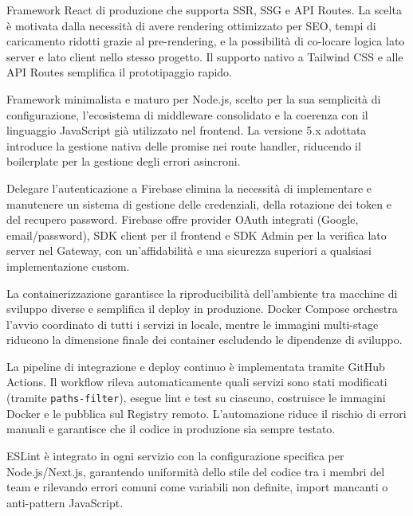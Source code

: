 \documentclass[12pt,a4paper,twoside]{report}
\newenvironment{toollist}{%
  \begin{description}[
    style=nextline,
    leftmargin=0pt,
    labelindent=0pt,
    font=\normalfont\bfseries,
    itemsep=6pt
  ]
}{%
  \end{description}
}
\begin{document}
\begin{toollist}
  \item[Next.js (Frontend)]
    Framework React di produzione che supporta SSR, SSG e API Routes. La scelta è motivata dalla necessità di avere rendering ottimizzato per SEO, tempi di caricamento ridotti grazie al pre-rendering, e la possibilità di co-locare logica lato server e lato client nello stesso progetto. Il supporto nativo a Tailwind CSS e alle API Routes semplifica il prototipaggio rapido.

  \item[Express.js (Backend)]
    Framework minimalista e maturo per Node.js, scelto per la sua semplicità di configurazione, l'ecosistema di middleware consolidato e la coerenza con il linguaggio JavaScript già utilizzato nel frontend. La versione 5.x adottata introduce la gestione nativa delle promise nei route handler, riducendo il boilerplate per la gestione degli errori asincroni.

  \item[Firebase Authentication]
    Delegare l'autenticazione a Firebase elimina la necessità di implementare e manutenere un sistema di gestione delle credenziali, della rotazione dei token e del recupero password. Firebase offre provider OAuth integrati (Google, email/password), SDK client per il frontend e SDK Admin per la verifica lato server nel Gateway, con un'affidabilità e una sicurezza superiori a qualsiasi implementazione custom.

  \item[Docker e Docker Compose]
    La containerizzazione garantisce la riproducibilità dell'ambiente tra macchine di sviluppo diverse e semplifica il deploy in produzione. Docker Compose orchestra l'avvio coordinato di tutti i servizi in locale, mentre le immagini multi-stage riducono la dimensione finale dei container escludendo le dipendenze di sviluppo.

  \item[GitHub Actions (CI/CD)]
    La pipeline di integrazione e deploy continuo è implementata tramite GitHub Actions. Il workflow rileva automaticamente quali servizi sono stati modificati (tramite \texttt{paths-filter}), esegue lint e test su ciascuno, costruisce le immagini Docker e le pubblica sul Registry remoto. L'automazione riduce il rischio di errori manuali e garantisce che il codice in produzione sia sempre testato.

  \item[ESLint (Analisi Statica)]
    ESLint è integrato in ogni servizio con la configurazione specifica per Node.js/Next.js, garantendo uniformità dello stile del codice tra i membri del team e rilevando errori comuni come variabili non definite, import mancanti o anti-pattern JavaScript.


\end{toollist}
\end{document}
